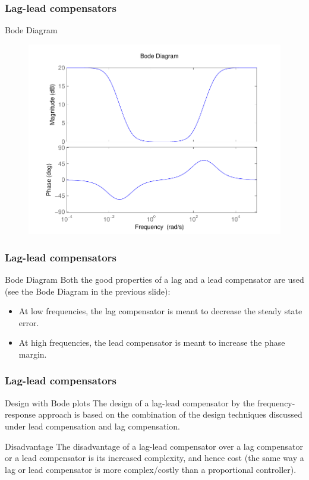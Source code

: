 \begin{frame}
\frametitle{Lag-lead compensators}
\begin{block}{Bode Diagram}
\begin{figure}
	\centering
	\includegraphics[width=0.5
	\linewidth]{laglead}
\end{figure}	
\end{block}
\end{frame}

\begin{frame}
\frametitle{Lag-lead compensators}	\begin{block}{Bode Diagram}
	Both the good properties of a lag and a lead compensator are used (see the Bode Diagram in the previous slide):
	\begin{itemize}
	\item At low frequencies, the lag compensator is meant to decrease the steady state error.
	\item At high frequencies, the lead compensator is meant to increase the phase margin.
	\end{itemize}
\end{block}
\end{frame}

\begin{frame}
\frametitle{Lag-lead compensators}
\begin{block}{Design with Bode plots}
	The
	design of a lag-lead compensator by the frequency-response approach is based on the
	combination of the design techniques discussed under lead compensation and lag
	compensation.
\end{block}
\begin{block}{Disadvantage}
	The disadvantage of a lag-lead compensator over a lag compensator or a lead compensator is its increased complexity, and hence cost (the same way a lag or lead compensator is more complex/costly than a proportional controller).
\end{block}
\end{frame}

